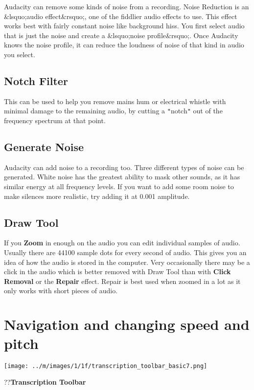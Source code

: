 \documentclass[twocolumn]{book}
\begin{document}
Audacity can remove some kinds of noise from a recording.  Noise Reduction is an \&lsquo;audio effect\&rsquo;, one of the fiddlier audio effects to use.  This effect works best with fairly constant noise like background hiss.  You first select audio that is just the noise and create a \&lsquo;noise profile\&rsquo;.  Once Audacity knows the noise profile, it can reduce the loudness of noise of that kind in audio you select. 

\subsection{Notch Filter}


This can be used to help you remove mains hum or electrical whistle with minimal damage to the remaining audio, by cutting a \texttt{{}"{}}notch\texttt{{}"{}} out of the frequency spectrum at that point.

\subsection{Generate Noise}


Audacity can add noise to a recording too. Three different types of noise can be generated. White noise has the greatest ability to mask other sounds, as it has similar energy at all frequency levels. If you want to add some room noise to make silences more realistic, try adding it at 0.001 amplitude.

\subsection{Draw Tool}


If you \textbf{Zoom} in enough on the audio you can edit individual samples of audio. Usually there are 44100 sample dots for every second of audio.  This  gives you an idea of how the audio is stored in the computer.  Very occasionally there may be a click in the audio which is better removed with Draw Tool than with \textbf{Click Removal} or the \textbf{Repair} effect.  Repair is best used when zoomed in a lot as it only works with short pieces of audio.



\section{Navigation and changing speed and pitch}

\par\texttt{[image: ../m/images/1/1f/transcription\_toolbar\_basic7.png]}\par??\textbf{Transcription Toolbar}
\end{document}
